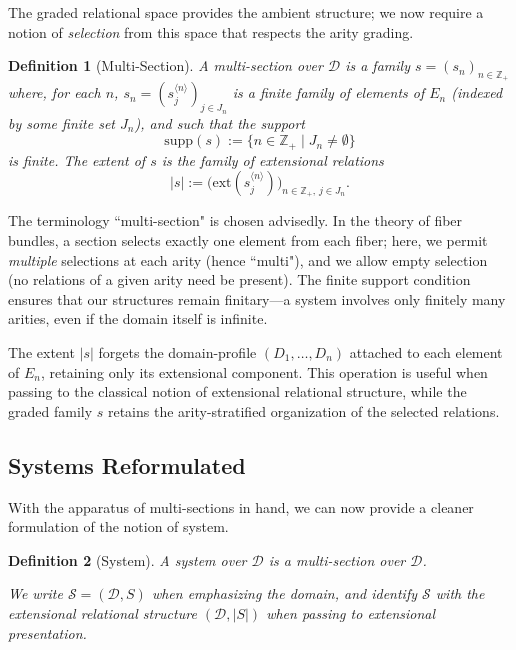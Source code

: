 \documentclass[12pt,a4paper]{article}
\newtheorem{definition}{Definition}[section]
\newcommand{\domain}{\mathcal{D}}
\newcommand{\supp}{\mathrm{supp}}
\begin{document}
The graded relational space provides the ambient structure; we now require a notion of \emph{selection} from this space that respects the arity grading.

\begin{definition}[Multi-Section]
\label{def:multi-section}
A \emph{multi-section} over $\domain$ is a family $s = (s_n)_{n\in \mathbb{Z}_+}$ where, for each $n$, $s_n = (s^{\langle n \rangle}_j)_{j\in J_n}$ is a finite family of elements of $E_n$ (indexed by some finite set $J_n$), and such that the support
$$
\supp(s) := \{n \in \mathbb{Z}_+ \mid J_n \neq \emptyset\}
$$
is finite.
The \emph{extent} of $s$ is the family of extensional relations
$$
|s| := \big(\mathrm{ext}(s^{\langle n \rangle}_j)\big)_{n\in \mathbb{Z}_+,\, j\in J_n}.
$$
\end{definition}

The terminology ``multi-section" is chosen advisedly. In the theory of fiber bundles, a section selects exactly one element from each fiber; here, we permit \emph{multiple} selections at each arity (hence ``multi"), and we allow empty selection (no relations of a given arity need be present). The finite support condition ensures that our structures remain finitary---a system involves only finitely many arities, even if the domain itself is infinite.

The extent $|s|$ forgets the domain-profile $(D_1,\dots,D_n)$ attached to each element of $E_n$, retaining only its extensional component. This operation is useful when passing to the classical notion of extensional relational structure, while the graded family $s$ retains the arity-stratified organization of the selected relations.

\subsection{Systems Reformulated}

With the apparatus of multi-sections in hand, we can now provide a cleaner formulation of the notion of system.

\begin{definition}[System]
\label{def:system}
A \emph{system} over $\domain$ is a multi-section over $\domain$.

We write $\mathcal{S} = (\domain, S)$ when emphasizing the domain, and identify $\mathcal{S}$ with the extensional relational structure $(\domain, |S|)$ when passing to extensional presentation.
\end{definition}
\end{document}
